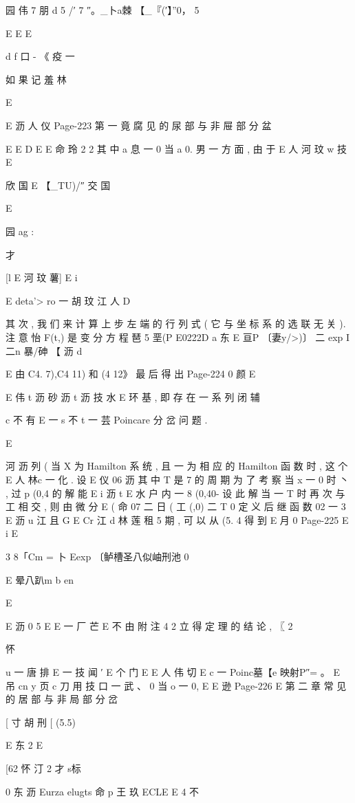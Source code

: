 {{{{{{{{{{{{{园 伟 7 朋 d 5
/′ 7 ″。_卜a棘 【_『(′】”0， 5

E
E
E

d
f 口 - 《 疫 一

如 果 记
羞 林

E

E 沥 人 仪
Page-223
第 一 竟 腐 见 的 尿 部 与 非 屉 部 分 盆

E E
D
E
E 命 玲 2 2
其 中 a 息 一 0 当 a 0. 男 一 方 面 , 由 于
E 人 河 玟 w
技
E

欣 国
E 【_TU)/″ 交 国

E

园
ag :

才

[l E 河 玟 薯]
E i

E
deta'> ro 一 胡 玟 江 人 D

其 次 , 我 们 来 计 算 上 步 左 端 的 行 列 式 ( 它 与 坐 标 系 的 选 联 无 关 ). 注
意 怡 F(t,) 是 变 分 方 程
琶 5 垩(P E0222D
a 东
E 亘P 〔妻y/>)〕 二 exp I二n 暴/砷 【 沥 d

E
由 C4. 7),C4 11) 和 (4 12》 最 后 得 出
Page-224
0 颜 E

E 伟 t 沥 砂 沥 t 沥 技 水 E
环 基 , 即 存 在 一 系 列 闭 辅

c 不 有
E 一
s 不
t 一 芸
Poincare 分 岔 问 题 .

E

河 沥
列 ( 当 X 为 Hamilton 系 统 , 且 一 为 相 应 的 Hamilton 函 数 时 , 这 个
E 人 林c 一
化 . 设
E 仪 06 沥
其 中 T 是 7 的 周 期 为 了 考 察 当 x 一 0 时 丶 , 过 p (0,4 的 解 能
E i 沥 t
E 水
户 内 一 8 (0,40- 设 此 解 当 一 T 时 再 次 与 工 相 交 , 则 由 微 分
E
( 命 07 二 日 ( 工 (,0) 二 T 0
定 义 后 继 函 数
02 一 3
E 沥
u 江
且 G E Cr
江 d 林 莲 租 5
期 , 可 以 从 (5. 4 得 到
E 月 0
Page-225
E i E

3
8「Cm = 卜 Eexp 〔鲈槽圣八似岫刑池 0

E 晕八趴m b en

E

E 沥 0 5
E
E 一 厂 芒
E 不
由 附 注 4 2 立 得 定 理 的 结 论 , 〖
2

怀

u 一 唐 排
E 一 技
闻 ′
E 个
门
E
E 人 伟 切
E c 一
Poinc墓【e 映射P″= 。
E 吊 cn y 页 c 刀 用
技 口
一
武
、 0 当 o 一 0,
E
E 逊
Page-226
E 第 二 章 常 见 的 居 部 与 非 局 部 分 岔

[ 寸 胡 刑
[ (5.5)

E 东 2
E

[62 怀 汀 2 才 s标

0 东 沥
Eurza elugts 命 p 王
玖
ECLE E 4 不

}}}}}}}}}}}}}
